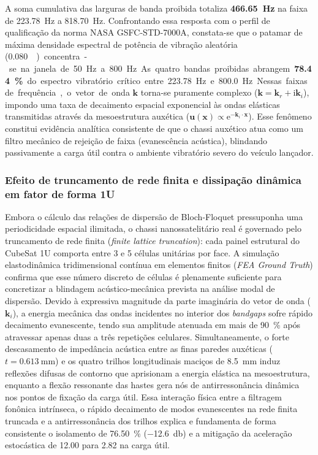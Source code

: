 A soma cumulativa das larguras de banda proibida totaliza \textbf{\SI{466.65}{\hertz}} na faixa de \SI{223.78}{\hertz} a \SI{818.70}{\hertz}. Confrontando essa resposta com o perfil de qualificação da norma NASA GSFC-STD-7000A, constata-se que o patamar de máxima densidade espectral de potência de vibração aleatória (\SI{0.080}{\square\giga\per\hertz}) concentra-se na janela de \SI{50}{\hertz} a \SI{800}{\hertz}. As quatro bandas proibidas abrangem \textbf{\SI{78.44}{\percent}} do espectro vibratório crítico entre \SI{223.78}{\hertz} e \SI{800.0}{\hertz}. 

Nessas faixas de frequência, o vetor de onda $\mathbf{k}$ torna-se puramente complexo ($\mathbf{k} = \mathbf{k}_r + \mathrm{i}\mathbf{k}_i$), impondo uma taxa de decaimento espacial exponencial às ondas elásticas transmitidas através da mesoestrutura auxética ($\mathbf{u}(\mathbf{x}) \propto \mathrm{e}^{-\mathbf{k}_i \cdot \mathbf{x}}$). Esse fenômeno constitui evidência analítica consistente de que o chassi auxético atua como um filtro mecânico de rejeição de faixa (evanescência acústica), blindando passivamente a carga útil contra o ambiente vibratório severo do veículo lançador.

\subsubsection{Efeito de truncamento de rede finita e dissipação dinâmica em fator de forma 1U}
\label{subsubsec:truncamento-1u}
Embora o cálculo das relações de dispersão de Bloch-Floquet pressuponha uma periodicidade espacial ilimitada, o chassi nanossatelitário real é governado pelo truncamento de rede finita (\textit{finite lattice truncation}): cada painel estrutural do CubeSat 1U comporta entre 3 e 5 células unitárias por face. A simulação elastodinâmica tridimensional contínua em elementos finitos (\textit{FEA Ground Truth}) confirma que esse número discreto de células é plenamente suficiente para concretizar a blindagem acústico-mecânica prevista na análise modal de dispersão. Devido à expressiva magnitude da parte imaginária do vetor de onda ($\mathbf{k}_i$), a energia mecânica das ondas incidentes no interior dos \textit{bandgaps} sofre rápido decaimento evanescente, tendo sua amplitude atenuada em mais de \SI{90}{\percent} após atravessar apenas duas a três repetições celulares. Simultaneamente, o forte descasamento de impedância acústica entre as finas paredes auxéticas ($t = \SI{0.613}{\milli\metre}$) e os quatro trilhos longitudinais maciços de \SI{8.5}{\milli\metre} induz reflexões difusas de contorno que aprisionam a energia elástica na mesoestrutura, enquanto a flexão ressonante das hastes gera nós de antirressonância dinâmica nos pontos de fixação da carga útil. Essa interação física entre a filtragem fonônica intrínseca, o rápido decaimento de modos evanescentes na rede finita truncada e a antirressonância dos trilhos explica e fundamenta de forma consistente o isolamento de \SI{76.50}{\percent} (\SI{-12.6}{\decibel}) e a mitigação da aceleração estocástica de \SI{12.00}{\Grms} para \SI{2.82}{\Grms} na carga útil.


